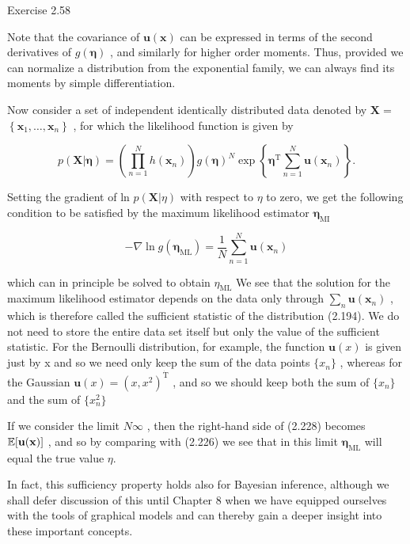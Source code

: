 \documentclass[
  10
]{article}
\begin{document}
Exercise 2.58

Note that the covariance of \(\mathbf { u } ( \mathbf { x } )\) can be
expressed in terms of the second derivatives of \(g ( \pmb { \eta } )\)
, and similarly for higher order moments. Thus, provided we can
normalize a distribution from the exponential family, we can always find
its moments by simple differentiation.

Now consider a set of independent identically distributed data denoted
by \(\mathbf { X } =\)
\(\left\{ \mathbf { x } _ { 1 } , \ldots , \mathbf { x } _ { n } \right\}\)
, for which the likelihood function is given by

\[
p (\mathbf {X} | \boldsymbol {\eta}) = \left(\prod_ {n = 1} ^ {N} h (\mathbf {x} _ {n})\right) g (\boldsymbol {\eta}) ^ {N} \exp \left\{\boldsymbol {\eta} ^ {\mathrm{T}} \sum_ {n = 1} ^ {N} \mathbf {u} (\mathbf {x} _ {n}) \right\}.\tag{2.227}
\]

Setting the gradient of ln \(p ( \mathbf { X } | \eta )\) with respect
to \(\eta\) to zero, we get the following condition to be satisfied by
the maximum likelihood estimator \(\pmb { \eta } _ { \mathrm { M I } }\)

\[
- \nabla \ln g (\pmb {\eta} _ {\mathrm{ML}}) = \frac {1}{N} \sum_ {n = 1} ^ {N} \mathbf {u} (\mathbf {x} _ {n})\tag{2.228}
\]

which can in principle be solved to obtain
\(\eta _ { \mathrm { M L } }\) We see that the solution for the maximum
likelihood estimator depends on the data only through
\(\textstyle \sum _ { n } \mathbf { u } ( \mathbf { x } _ { n } )\) ,
which is therefore called the sufficient statistic of the distribution
(2.194). We do not need to store the entire data set itself but only the
value of the sufficient statistic. For the Bernoulli distribution, for
example, the function \(\mathbf { u } ( x )\) is given just by x and so
we need only keep the sum of the data points \(\{ x _ { n } \}\) ,
whereas for the Gaussian
\({ \mathbf u } ( x ) = ( x , x ^ { 2 } ) ^ { \dot { \mathrm { T } } }\)
, and so we should keep both the sum of \(\{ x _ { n } \}\) and the sum
of \(\{ x _ { n } ^ { 2 } \}\)

If we consider the limit \(N  \infty\) , then the right-hand side of
(2.228) becomes \(\mathbb { E } [ { \bf u } ( { \bf x } ) ]\) , and so
by comparing with (2.226) we see that in this limit
\(\pmb { \eta } _ { \mathrm { M L } }\) will equal the true value
\(\eta .\)

In fact, this sufficiency property holds also for Bayesian inference,
although we shall defer discussion of this until Chapter 8 when we have
equipped ourselves with the tools of graphical models and can thereby
gain a deeper insight into these important concepts.
\end{document}
